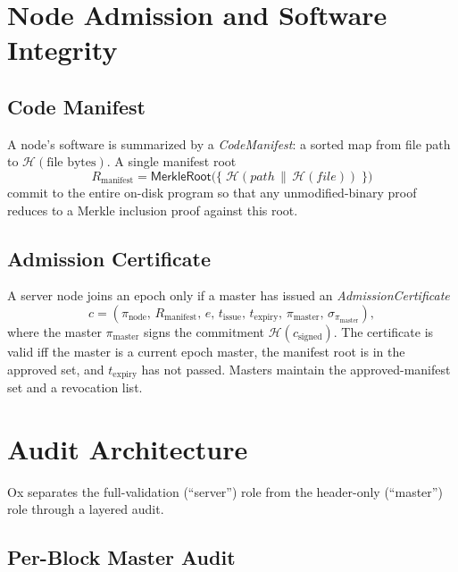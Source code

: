 \documentclass[11pt,a4paper]{article}
\theoremstyle{definition}
\newcommand{\ox}{\textsf{Ox}}
\newcommand{\hash}{\mathcal{H}}
\begin{document}
\section{Node Admission and Software Integrity}
\label{sec:admission}

\subsection{Code Manifest}

A node's software is summarized by a \emph{CodeManifest}: a sorted map from file
path to $\hash(\text{file bytes})$.  A single manifest root
\[
R_{\mathrm{manifest}} = \mathsf{MerkleRoot}\bigl(\{\;\hash(\mathit{path}\,\|\,\hash(\mathit{file}))\;\}\bigr)
\]
commit to the entire on-disk program so that any unmodified-binary proof
reduces to a Merkle inclusion proof against this root.

\subsection{Admission Certificate}

A server node joins an epoch only if a master has issued an
\emph{AdmissionCertificate}
\[
c = (\pi_{\mathrm{node}},\, R_{\mathrm{manifest}},\, e,\, t_{\mathrm{issue}},\, t_{\mathrm{expiry}},\, \pi_{\mathrm{master}},\, \sigma_{\pi_{\mathrm{master}}}),
\]
where the master $\pi_{\mathrm{master}}$ signs the commitment
$\hash(c_{\mathrm{signed}})$.  The certificate is valid iff the master is a
current epoch master, the manifest root is in the approved set, and
$t_{\mathrm{expiry}}$ has not passed.  Masters maintain the approved-manifest
set and a revocation list.

\section{Audit Architecture}
\label{sec:audit}

\ox{} separates the full-validation (``server'') role from the
header-only (``master'') role through a layered audit.

\subsection{Per-Block Master Audit}
\end{document}
